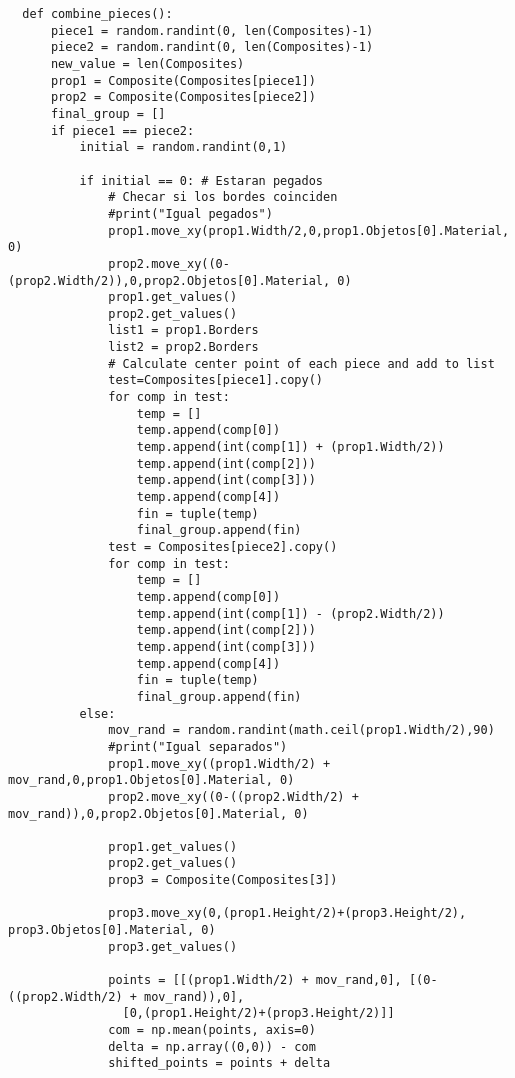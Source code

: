 \begin{verbatim}
  def combine_pieces():
      piece1 = random.randint(0, len(Composites)-1)
      piece2 = random.randint(0, len(Composites)-1)
      new_value = len(Composites)
      prop1 = Composite(Composites[piece1])
      prop2 = Composite(Composites[piece2])
      final_group = []
      if piece1 == piece2:
          initial = random.randint(0,1)
          
          if initial == 0: # Estaran pegados
              # Checar si los bordes coinciden
              #print("Igual pegados")
              prop1.move_xy(prop1.Width/2,0,prop1.Objetos[0].Material, 0)
              prop2.move_xy((0-(prop2.Width/2)),0,prop2.Objetos[0].Material, 0)
              prop1.get_values()
              prop2.get_values()
              list1 = prop1.Borders
              list2 = prop2.Borders
              # Calculate center point of each piece and add to list
              test=Composites[piece1].copy()
              for comp in test:
                  temp = []
                  temp.append(comp[0])
                  temp.append(int(comp[1]) + (prop1.Width/2))
                  temp.append(int(comp[2]))
                  temp.append(int(comp[3]))
                  temp.append(comp[4])
                  fin = tuple(temp)
                  final_group.append(fin)
              test = Composites[piece2].copy()
              for comp in test:
                  temp = []
                  temp.append(comp[0])
                  temp.append(int(comp[1]) - (prop2.Width/2))
                  temp.append(int(comp[2]))
                  temp.append(int(comp[3]))
                  temp.append(comp[4])
                  fin = tuple(temp)
                  final_group.append(fin)
          else:
              mov_rand = random.randint(math.ceil(prop1.Width/2),90)
              #print("Igual separados")
              prop1.move_xy((prop1.Width/2) + mov_rand,0,prop1.Objetos[0].Material, 0)
              prop2.move_xy((0-((prop2.Width/2) + mov_rand)),0,prop2.Objetos[0].Material, 0)

              prop1.get_values()
              prop2.get_values()
              prop3 = Composite(Composites[3])
              
              prop3.move_xy(0,(prop1.Height/2)+(prop3.Height/2), prop3.Objetos[0].Material, 0)
              prop3.get_values()

              points = [[(prop1.Width/2) + mov_rand,0], [(0-((prop2.Width/2) + mov_rand)),0], 
                [0,(prop1.Height/2)+(prop3.Height/2)]]
              com = np.mean(points, axis=0)
              delta = np.array((0,0)) - com
              shifted_points = points + delta


\end{verbatim}
